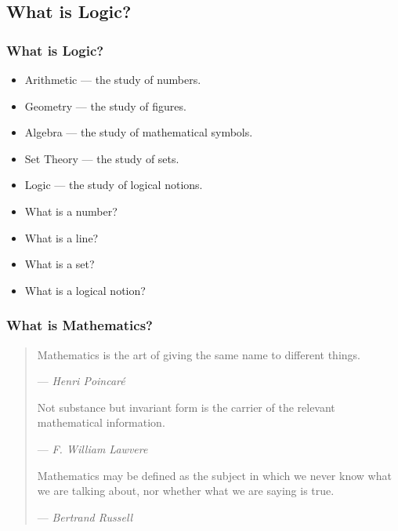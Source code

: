 \documentclass[UTF8,11pt,colorlinks,compress,openany]{beamer}%
\begin{document}
\subsection{What is Logic?}

\begin{frame}\frametitle{What is Logic?}
	\begin{itemize}
		\item Arithmetic --- the study of numbers.
		\item Geometry --- the study of figures.
		\item Algebra --- the study of mathematical symbols.
		\item Set Theory --- the study of sets.
		\item Logic --- the study of logical notions.
	\end{itemize}
	\begin{itemize}
		\item What is a number?
		\item What is a line?
		\item What is a set?
		\item What is a logical notion?
	\end{itemize}
\end{frame}

\begin{frame}\frametitle{What is Mathematics?}
	\begin{quote}
		Mathematics is the art of giving the same name to different things.\par
		\hfill --- \textsl{Henri Poincar\'e}
		
		Not substance but invariant form is the carrier of the relevant mathematical information.\par
		\hfill --- \textsl{F. William Lawvere}
		
		Mathematics may be defined as the subject in which we never know what we are talking about, nor whether what we are saying is true.\par
		\hfill --- \textsl{Bertrand Russell}
	\end{quote}
\end{frame}
\end{document}

